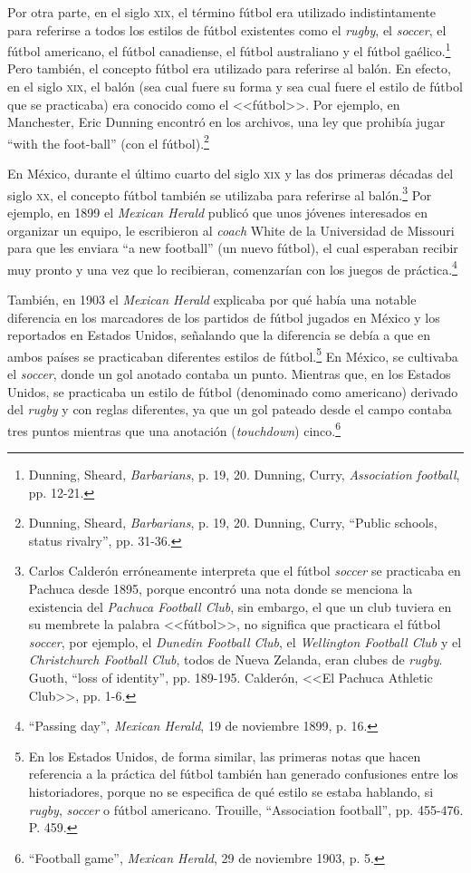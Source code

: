 \documentclass[11pt,a5paper,twoside]{book} %
\begin{document}
Por otra parte, en el siglo \textsc{xix}, el término fútbol era utilizado indistintamente para referirse a todos los estilos de fútbol existentes como el \emph{rugby}, el \emph{soccer}, el fútbol americano, el fútbol canadiense, el fútbol australiano y el fútbol gaélico.\footnote{Dunning, Sheard, \emph{Barbarians}, p. 19, 20. Dunning, Curry, \emph{Association football}, pp. 12-21.} Pero también, el concepto fútbol era utilizado para referirse al balón. En efecto, en el siglo \textsc{xix}, el balón (sea cual fuere su forma y sea cual fuere el estilo de fútbol que se practicaba) era conocido como el <<fútbol>>. Por ejemplo, en Manchester, Eric Dunning encontró en los archivos, una ley que prohibía jugar ``with the foot-ball'' (con el fútbol).\footnote{Dunning, Sheard, \emph{Barbarians}, p. 19, 20. Dunning, Curry, ``Public schools, status rivalry'', pp. 31-36.}

En México, durante el último cuarto del siglo \textsc{xix} y las dos primeras décadas del siglo \textsc{xx}, el concepto fútbol también se utilizaba para referirse al balón.\footnote{Carlos Calderón erróneamente interpreta que el fútbol \emph{soccer} se practicaba en Pachuca desde 1895, porque encontró una nota donde se menciona la existencia del \emph{Pachuca Football Club}, sin embargo, el que un club tuviera en su membrete la palabra <<fútbol>>, no significa que practicara el fútbol \emph{soccer}, por ejemplo, el \emph{Dunedin Football Club}, el \emph{Wellington Football Club} y el \emph{Christchurch Football Club}, todos de Nueva Zelanda, eran clubes de \emph{rugby}. Guoth, ``loss of identity'', pp. 189-195. Calderón, <<El Pachuca Athletic Club>>, pp. 1-6.} Por ejemplo, en 1899 el \emph{Mexican Herald} publicó que unos jóvenes interesados en organizar un equipo, le escribieron al \emph{coach} White de la Universidad de Missouri para que les enviara ``a new football'' (un nuevo fútbol), el cual esperaban recibir muy pronto y una vez que lo recibieran, comenzarían con los juegos de práctica.\footnote{``Passing day'', \emph{Mexican Herald}, 19 de noviembre 1899, p. 16.}

También, en 1903 el \emph{Mexican Herald} explicaba por qué había una notable diferencia en los marcadores de los partidos de fútbol jugados en México y los reportados en Estados Unidos, señalando que la diferencia se debía a que en ambos países se practicaban diferentes estilos de fútbol.\footnote{En los Estados Unidos, de forma similar, las primeras notas que hacen referencia a la práctica del fútbol también han generado confusiones entre los historiadores, porque no se especifica de qué estilo se estaba hablando, si \emph{rugby}, \emph{soccer} o fútbol americano. Trouille, ``Association football'', pp. 455-476. P. 459.} En México, se cultivaba el \emph{soccer}, donde un gol anotado contaba un punto. Mientras que, en los Estados Unidos, se practicaba un estilo de fútbol (denominado como americano) derivado del \emph{rugby} y con reglas diferentes, ya que un gol pateado desde el campo contaba tres puntos mientras que una anotación (\emph{touchdown}) cinco.\footnote{``Football game'', \emph{Mexican Herald}, 29 de noviembre 1903, p. 5.}
\end{document}
